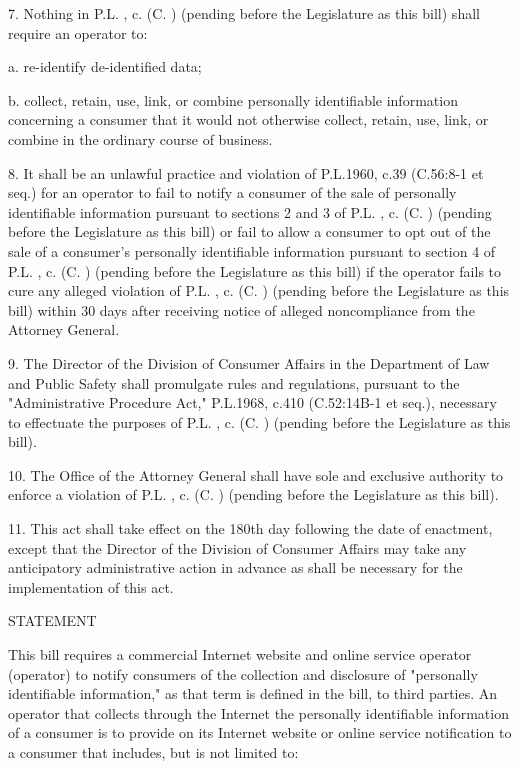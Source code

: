  

     7.    Nothing in P.L.    , c.    (C.      ) (pending before the Legislature as this bill) shall require an operator to:

     a.     re-identify de-identified data;

     b.    collect, retain, use, link, or combine personally identifiable information concerning a consumer that it would not otherwise collect, retain, use, link, or combine in the ordinary course of business.

 

     8.    It shall be an unlawful practice and violation of P.L.1960, c.39 (C.56:8-1 et seq.) for an operator to fail to notify a consumer of the sale of personally identifiable information pursuant to sections 2 and 3 of P.L.    , c.    (C.      ) (pending before the Legislature as this bill) or fail to allow a consumer to opt out of the sale of a consumer's personally identifiable information pursuant to section 4 of P.L.    , c.    (C.      ) (pending before the Legislature as this bill) if the operator fails to cure any alleged violation of P.L.    , c.    (C.        ) (pending before the Legislature as this bill) within 30 days after receiving notice of alleged noncompliance from the Attorney General.

 

     9.    The Director of the Division of Consumer Affairs in the Department of Law and Public Safety shall promulgate rules and regulations, pursuant to the "Administrative Procedure Act,"  P.L.1968, c.410 (C.52:14B-1 et seq.), necessary to effectuate the purposes of P.L.    , c.    (C.      ) (pending before the Legislature as this bill).

 

     10.  The Office of the Attorney General shall have sole and exclusive authority to enforce a violation of P.L.    , c.    (C.      ) (pending before the Legislature as this bill).

 

     11.  This act shall take effect on the 180th day following the date of enactment, except that the Director of the Division of Consumer Affairs may take any anticipatory administrative action in advance as shall be necessary for the implementation of this act.

 

 

STATEMENT

 

     This bill requires a commercial Internet website and online service operator (operator) to notify consumers of the collection and disclosure of "personally identifiable information," as that term is defined in the bill, to third parties. An operator that collects through the Internet the personally identifiable information of a consumer is to provide on its Internet website or online service notification to a consumer that includes, but is not limited to:

